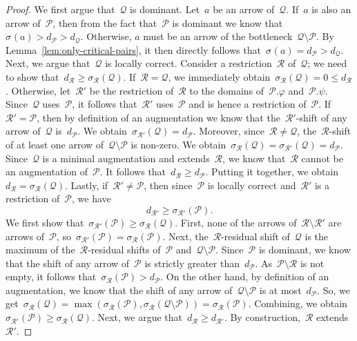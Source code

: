 \documentclass[11pt]{article}
\newcommand{\shift}[1]{\sigma_{#1}}
\newcommand{\resdist}[1]{d_{#1}}
\renewcommand{\phi}{\varphi}
\renewcommand{\P}{\mathcal{P}}
\newcommand{\Q}{\mathcal{Q}}
\newcommand{\R}{\mathcal{R}}
\begin{document}
\begin{proof}
    We first argue that~$\Q$ is dominant.
    Let~$a$ be an arrow of~$\Q$.
    If~$a$ is also an arrow of~$\P$, then from the fact that~$\P$ is dominant we know that~$\shift{}(a) > \resdist{\P} > \resdist{\Q}$.
    Otherwise, $a$ must be an arrow of the bottleneck~$\Q \setminus \P$.
    By Lemma~\ref{lem:only-critical-pairs}, it then directly follows that~$\shift{}(a) = \resdist{\P} > \resdist{\Q}$.
%
    Next, we argue that~$\Q$ is locally correct.
    Consider a restriction~$\R$ of~$\Q$; we need to show that~$\resdist{\R} \ge \shift{\R}(\Q)$.
    If~$\R = \Q$, we immediately obtain~$\shift{\R}(\Q) = 0 \le \resdist{\R}$.
    Otherwise, let~$\R'$ be the restriction of~$\R$ to the domains of~$\P.\phi$ and~$\P.\psi$.
    Since~$\Q$ uses~$\P$, it follows that~$\R'$ uses~$\P$ and is hence a restriction of~$\P$.
    If~$\R' = \P$, then by definition of an augmentation we know that the~$\R'$-shift of any arrow of~$\Q$ is~$\resdist{\P}$.
    We obtain~$\shift{\R'}(\Q) = \resdist{\P}$.
    Moreover, since~$\R \neq \Q$, the~$\R$-shift of at least one arrow of~$\Q \setminus \P$ is non-zero.
    We obtain~$\shift{\R}(\Q) = \shift{\R'}(\Q) = \resdist{\P}$.
    Since~$\Q$ is a minimal augmentation and extends~$\R$, we know that~$\R$ cannot be an augmentation of~$\P$.
    It follows that~$\resdist{\R} \ge \resdist{\P}$.
    Putting it together, we obtain~$\resdist{\R} = \shift{\R}(\Q)$.
%
    Lastly, if~$\R' \neq \P$, then since~$\P$ is locally correct and~$\R'$ is a restriction of~$\P$, we have
    \begin{equation}\label{eq:helper}
        \resdist{\R'} \ge \shift{\R'}(\P).
    \end{equation}
    We first show that~$\shift{\R'}(\P) \ge \shift{\R}(\Q)$.
    First, none of the arrows of~$\R \setminus \R'$ are arrows of~$\P$, so~$\shift{\R'}(\P) = \shift{\R}(\P)$.
    Next, the~$\R$-residual shift of~$\Q$ is the maximum of the~$\R$-residual shifts of~$\P$ and~$\Q \setminus \P$.
    Since~$\P$ is dominant, we know that the shift of any arrow of~$\P$ is strictly greater than~$\resdist{\P}$.
    As~$\P \setminus \R$ is not empty, it follows that~$\shift{\R}(\P) > \resdist{\P}$.
    On the other hand, by definition of an augmentation, we know that the shift of any arrow of~$\Q \setminus \P$ is at most~$\resdist{\P}$.
    So, we get~$\shift{\R}(\Q) = \max(\shift{\R}(\P), \shift{\R}(\Q \setminus \P)) = \shift{\R}(\P)$.
    Combining, we obtain~$\shift{\R'}(\P) \ge \shift{\R}(\Q)$.
%
    Next, we argue that~$\resdist{\R} \ge \resdist{\R'}$.
    By construction,~$\R$ extends~$\R'$.

\end{proof}
\end{document}
